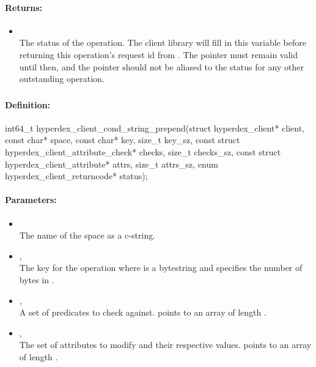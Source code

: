 \paragraph{Returns:}
\begin{itemize}[noitemsep]
\item {}\\
The status of the operation.  The client library will fill in this variable before returning this operation's request id from .  The pointer must remain valid until then, and the pointer should not be aliased to the status for any other outstanding operation.
\end{itemize}

\pagebreak
\subsubsection{}
\label{api:c:cond_string_prepend}


\paragraph{Definition:}
\begin{ccode}
int64_t hyperdex_client_cond_string_prepend(struct hyperdex_client* client,
        const char* space,
        const char* key, size_t key_sz,
        const struct hyperdex_client_attribute_check* checks, size_t checks_sz,
        const struct hyperdex_client_attribute* attrs, size_t attrs_sz,
        enum hyperdex_client_returncode* status);
\end{ccode}

\paragraph{Parameters:}
\begin{itemize}[noitemsep]
\item {}\\
The name of the space as a c-string.
\item {}, \\
The key for the operation where  is a bytestring and  specifies the number of bytes in .
\item {}, \\
A set of predicates to check against.   points to an array of length .
\item {}, \\
The set of attributes to modify and their respective values.   points to an array of length .
\end{itemize}

